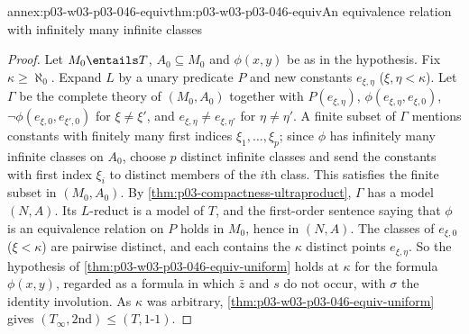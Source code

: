 \begin{annexitem}{annex:p03-w03-p03-046-equiv}{thm:p03-w03-p03-046-equiv}{An equivalence relation with infinitely many infinite classes}
\begin{proof}
Let \(M_0\entails T\), \(A_0\subseteq M_0\) and \(\phi(x,y)\) be as in the
hypothesis. Fix \(\kappa\ge\aleph_0\). Expand \(L\) by a unary predicate
\(P\) and new constants \(e_{\xi,\eta}\) (\(\xi,\eta<\kappa\)). Let
\(\Gamma\) be the complete theory of \((M_0,A_0)\) together with
\(P(e_{\xi,\eta})\), \(\phi(e_{\xi,\eta},e_{\xi,0})\),
\(\neg\phi(e_{\xi,0},e_{\xi',0})\) for \(\xi\neq\xi'\), and
\(e_{\xi,\eta}\neq e_{\xi,\eta'}\) for \(\eta\neq\eta'\). A finite subset of
\(\Gamma\) mentions constants with finitely many first indices
\(\xi_1,\dots,\xi_p\); since \(\phi\) has infinitely many infinite classes
on \(A_0\), choose \(p\) distinct infinite classes and send the constants
with first index \(\xi_i\) to distinct members of the \(i\)th class. This
satisfies the finite subset in \((M_0,A_0)\). By
\cref{thm:p03-compactness-ultraproduct}, \(\Gamma\) has a model \((N,A)\). Its
\(L\)-reduct is a model of \(T\), and the first-order sentence saying that
\(\phi\) is an equivalence relation on \(P\) holds in \(M_0\), hence in
\((N,A)\). The classes of \(e_{\xi,0}\) (\(\xi<\kappa\)) are pairwise
distinct, and each contains the \(\kappa\) distinct points
\(e_{\xi,\eta}\). So the hypothesis of
\cref{thm:p03-w03-p03-046-equiv-uniform} holds at \(\kappa\) for the formula
\(\phi(x,y)\), regarded as a formula in which \(\bar z\) and \(s\) do not
occur, with \(\sigma\) the identity involution. As \(\kappa\) was arbitrary,
\cref{thm:p03-w03-p03-046-equiv-uniform} gives
\((T_\infty,\mathrm{2nd})\le(T,\text{1-1})\).
\end{proof}
\end{annexitem}

